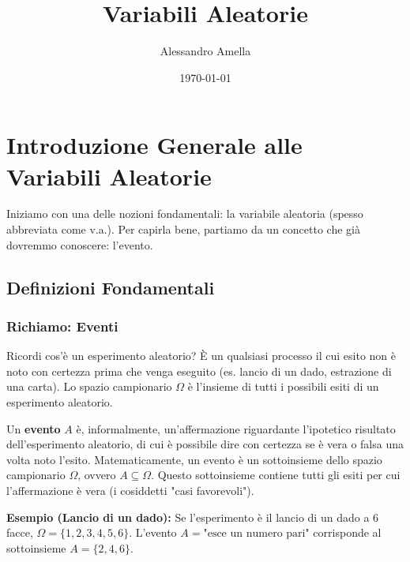 

\title{Variabili Aleatorie}
\author{Alessandro Amella}
\date{\today}


\maketitle
\tableofcontents
\newpage

\section{Introduzione Generale alle Variabili Aleatorie}

Iniziamo con una delle nozioni fondamentali: la variabile aleatoria (spesso abbreviata come v.a.). Per capirla bene, partiamo da un concetto che già dovremmo conoscere: l'evento.

\subsection{Definizioni Fondamentali}

\subsubsection{Richiamo: Eventi}
Ricordi cos'è un esperimento aleatorio? È un qualsiasi processo il cui esito non è noto con certezza prima che venga eseguito (es. lancio di un dado, estrazione di una carta).
Lo spazio campionario $\Omega$ è l'insieme di tutti i possibili esiti di un esperimento aleatorio.

Un \textbf{evento} $A$ è, informalmente, un'affermazione riguardante l'ipotetico risultato dell'esperimento aleatorio, di cui è possibile dire con certezza se è vera o falsa una volta noto l'esito. Matematicamente, un evento è un sottoinsieme dello spazio campionario $\Omega$, ovvero $A \subseteq \Omega$. Questo sottoinsieme contiene tutti gli esiti per cui l'affermazione è vera (i cosiddetti "casi favorevoli").

\begin{example}
\textbf{Esempio (Lancio di un dado):}
Se l'esperimento è il lancio di un dado a 6 facce, $\Omega = \{1, 2, 3, 4, 5, 6\}$.
L'evento $A = \text{"esce un numero pari"}$ corrisponde al sottoinsieme $A = \{2, 4, 6\}$.
\end{example}

